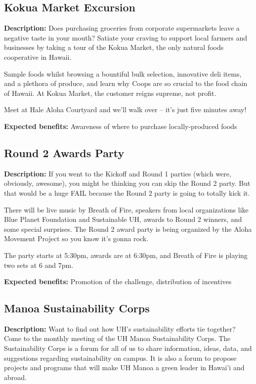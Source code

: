 \subsection{Kokua Market Excursion}

\textbf{Description:} Does purchasing groceries from corporate supermarkets leave a negative taste in your mouth? Satiate your craving to support local farmers and businesses by taking a tour of the Kokua Market, the only natural foods cooperative in Hawaii.

Sample foods whilst browsing a bountiful bulk selection, innovative deli items, and a plethora of produce, and learn why Coops are so crucial to the food chain of Hawaii.  At Kokua Market, the customer reigns supreme, not profit.

Meet at Hale Aloha Courtyard and we'll walk over -- it's just five minutes away!

\vspace{2ex}
\textbf{Expected benefits:} Awareness of where to purchase locally-produced foods


\subsection{Round 2 Awards Party}

\textbf{Description:} If you went to the Kickoff and Round 1 parties (which were, obviously, awesome), you might be thinking you can skip the Round 2 party. But that would be a huge FAIL because the Round 2 party is going to totally kick it.

There will be live music by Breath of Fire, speakers from local organizations like Blue Planet Foundation and Sustainable UH, awards to Round 2 winners, and some special surprises.  The Round 2 award party is being organized by the Aloha Movement Project so you know it's gonna rock.

The party starts at 5:30pm, awards are at 6:30pm, and Breath of Fire is playing two sets at 6 and 7pm.

\vspace{2ex}
\textbf{Expected benefits:} Promotion of the challenge, distribution of incentives


\subsection{Manoa Sustainability Corps}

\textbf{Description:} Want to find out how UH's sustainability efforts tie together? Come to the monthly meeting of the UH Manoa Sustainability Corps. The Sustainability Corps is a forum for all of us to share information, ideas, data, and suggestions regarding sustainability on campus. It is also a forum to propose projects and programs that will make UH Manoa a green leader in Hawai'i and abroad.

